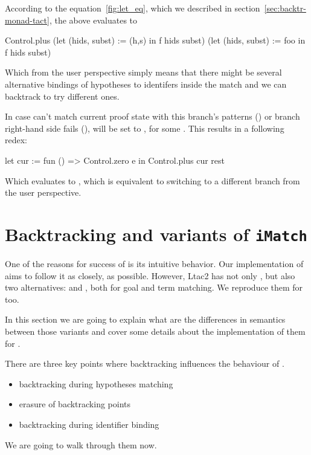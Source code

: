 According to the equation~\ref{fig:let_eq}, which we described in section~\ref{sec:backtr-monad-tact}, the above evaluates to
\begin{coq}
Control.plus
  (let (hids, subst) := (h,s) in
    f hids subst)
  (let (hids, subst) := foo in
   f hids subst)
\end{coq}

Which from the user perspective simply means that there might be several alternative bindings of hypotheses to identifers inside the match and we can backtrack to try different ones.

In case  can't match current proof state with this branch's patterns () or branch right-hand side fails (),  will be set to , for some .
This results in a following redex:
\begin{coq}
let cur := fun () => Control.zero e
in Control.plus cur rest
\end{coq}
Which evaluates to , which is equivalent to switching to a different branch from the user perspective.

\section{Backtracking and variants of \texttt{iMatch}}

One of the reasons for success of  is its intuitive behavior.
Our implementation of  aims to follow it as closely, as possible.
However, Ltac2 has not only , but also two alternatives:  and , both for goal and term matching.
We reproduce them for  too.

In this section we are going to explain what are the differences in semantics between those variants and cover some details about the implementation of them for .

There are three key points where backtracking influences the behaviour of .
\begin{itemize}
\item backtracking during hypotheses matching
\item erasure of backtracking points
\item backtracking during identifier binding
\end{itemize}
We are going to walk through them now.

